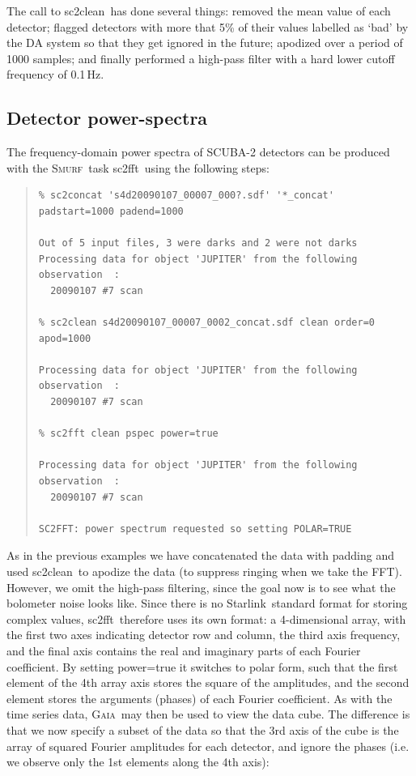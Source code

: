 \documentclass[twoside,11pt]{article}
\newenvironment{myquote}{\begin{quote}\begin{small}}{\end{small}\end{quote}}
\newcommand{\starlink}{\htmladdnormallink{Starlink}{http://starlink.jach.hawaii.edu}}
\newcommand{\gaia}{\xref{\textsc{Gaia}}{sun214}{}}
\newcommand{\smurf}{\xref{\textsc{Smurf}}{sun258}{}}
\newcommand{\task}[1]{\textsf{#1}}
\newcommand{\fft}{\xref{\task{sc2fft}}{sun258}{SC2FFT}}
\newcommand{\clean}{\xref{\task{sc2clean}}{sun258}{SC2CLEAN}}
\newcommand{\htmladdnormallink}[2]{#1}
\newcommand{\xref}[3]{#1}
\newcommand{\xlabel}[1]{}
\renewcommand{\_}{\texttt{\symbol{95}}}
\begin{document}
The call to \clean\ has done several things: removed the mean value of
each detector; flagged detectors with more that 5\% of their values
labelled as `bad' by the DA system so that they get ignored in the
future; apodized over a period of 1000 samples; and finally performed
a high-pass filter with a hard lower cutoff frequency of 0.1\,Hz.

\subsection{\xlabel{pspec}Detector power-spectra} 

The frequency-domain power spectra of SCUBA-2 detectors can be
produced with the \smurf\ task \fft\ using the following steps:


\begin{myquote}
\begin{verbatim}
% sc2concat 's4d20090107_00007_000?.sdf' '*_concat' padstart=1000 padend=1000

Out of 5 input files, 3 were darks and 2 were not darks
Processing data for object 'JUPITER' from the following observation  :
  20090107 #7 scan

% sc2clean s4d20090107_00007_0002_concat.sdf clean order=0 apod=1000 

Processing data for object 'JUPITER' from the following observation  :
  20090107 #7 scan

% sc2fft clean pspec power=true

Processing data for object 'JUPITER' from the following observation  :
  20090107 #7 scan

SC2FFT: power spectrum requested so setting POLAR=TRUE
\end{verbatim}
\end{myquote}

As in the previous examples we have concatenated the data with padding
and used \clean\ to apodize the data (to suppress ringing when we take
the FFT). However, we omit the high-pass filtering, since the goal now
is to see what the bolometer noise looks like. Since there is no
\starlink\ standard format for storing complex values, \fft\ therefore
uses its own format: a 4-dimensional array, with the first two axes
indicating detector row and column, the third axis frequency, and the
final axis contains the real and imaginary parts of each Fourier
coefficient. By setting power=true it switches to polar form, such
that the first element of the 4th array axis stores the square of the
amplitudes, and the second element stores the arguments (phases) of
each Fourier coefficient. As with the time series data, \gaia\ may
then be used to view the data cube. The difference is that we now
specify a subset of the data so that the 3rd axis of the cube is the
array of squared Fourier amplitudes for each detector, and ignore the
phases (i.e. we observe only the 1st elements along the 4th axis):
\end{document}
